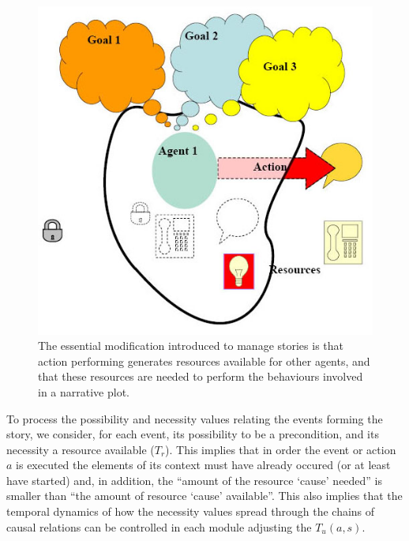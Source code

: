 \documentclass[
		twoside,openright,titlepage,numbers=noenddot,manychapters,
		headinclude,%
                footinclude=false,cleardoublepage=empty,
                BCOR=5mm,
		fontsize=11pt, %
                 enabledeprecatedfontcommands]{scrreprt}
\begin{document}
\begin{figure}[]

\begin{center}
\includegraphics[scale=0.3]{figures/EBN3.jpg}
\caption{The essential modification introduced to manage stories is that action performing generates resources available for other agents, and that these resources are needed to perform the behaviours involved in a narrative plot.}
\label{fig_EBN3}
\end{center}
\end{figure}



To process the possibility and necessity values relating the events forming the story, we consider, for each event, its possibility to be a precondition, and its necessity a resource available ($T_r$). This implies that in order the event or action $a$ is executed the elements of its context must have already occured (or at least have started) and, in addition, the “amount of the resource ‘cause’ needed” is smaller than “the amount of resource ‘cause’ available”. This also implies that the temporal dynamics of %
how the necessity values spread through the chains of causal relations can be controlled in each module adjusting the $T_u(a,s)$. 
\end{document}
